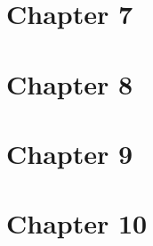 \documentclass[12pt]{article}
\begin{document}
\section*{Chapter 7}

\section*{Chapter 8}

\section*{Chapter 9}

\section*{Chapter 10}
\end{document}
